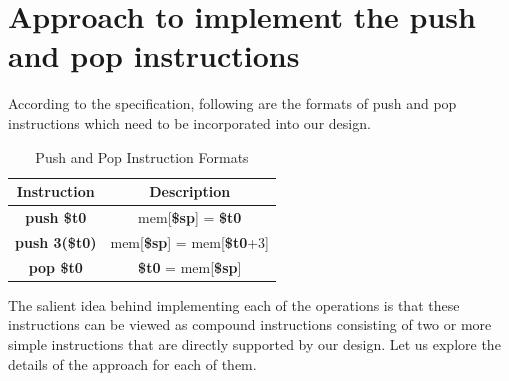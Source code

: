 \documentclass{article}
\begin{document}
		\newpage
		
		
		
		\section{\large{Approach to implement the push and pop instructions}}
		
		According to the specification, following are the formats of  push and pop instructions which need to be incorporated into our design.
		
		\begin{table}[H]
			\centering
			\begin{tabular}{|c|c|}
				\hline
				Instruction & Description \\
				\hline
				\textbf{push \$t0} & mem[\textbf{\$sp}] = \textbf{\$t0}    \\
				\hline
				\textbf{push 3(\$t0)} & mem[\textbf{\$sp}] = mem[\textbf{\$t0}+3]  \\
				\hline
				\textbf{pop \$t0} & \textbf{\$t0} = mem[\textbf{\$sp}] \\
				\hline
			\end{tabular}
			\caption{Push and Pop Instruction Formats}
			\label{tab:my_label}
		\end{table}
		
		The salient idea behind implementing each of the operations is that these instructions can be viewed as compound instructions consisting of two or more simple instructions that are directly supported by our design. Let us explore the details of the approach for each of them.
		
\end{document}
